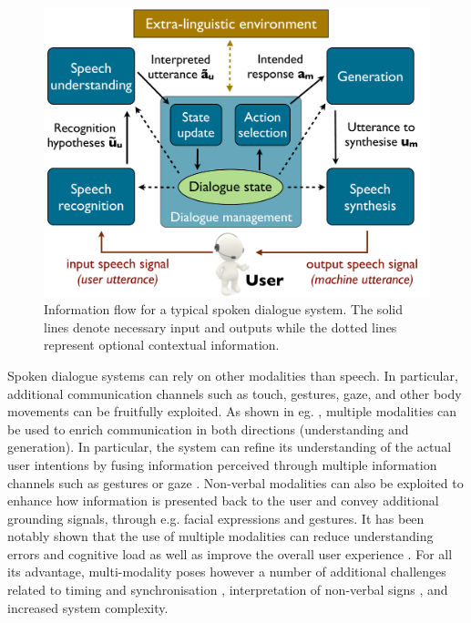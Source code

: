  \begin{figure}[h]
\centering
\vspace{5mm}
\includegraphics[scale=0.30]{imgs/architecture.pdf}
\vspace{5mm}
\caption{Information flow for a typical spoken dialogue system. The solid lines denote necessary input and outputs while the dotted lines represent optional contextual information.}
\label{fig:architecture}
\end{figure}

Spoken dialogue systems can rely on other modalities than speech.  In particular, additional communication channels such as touch, gestures, gaze, and other body movements can be fruitfully exploited.  As shown in eg. \cite{smartkom}, multiple modalities can be used to enrich communication in both directions (understanding and generation). In particular, the system can refine its understanding of the actual user intentions by fusing information perceived through multiple information channels such as gestures \citep{stiefelhagen2004} or gaze \citep{koller2012}.  Non-verbal modalities can also be exploited to enhance how information is presented back to the user and convey additional grounding signals, through e.g. facial expressions and gestures. It has been notably shown that the use of multiple modalities can reduce understanding errors and cognitive load \citep{oviatt2004we} as well as improve the overall user experience   \citep{JokinenH06}.  For all its advantage, multi-modality poses however a number of additional challenges related to timing and synchronisation \citep{DBLP:conf/hri/SalemKJ13}, interpretation of non-verbal signs \citep{cassell2007trading}, and increased system complexity. 

